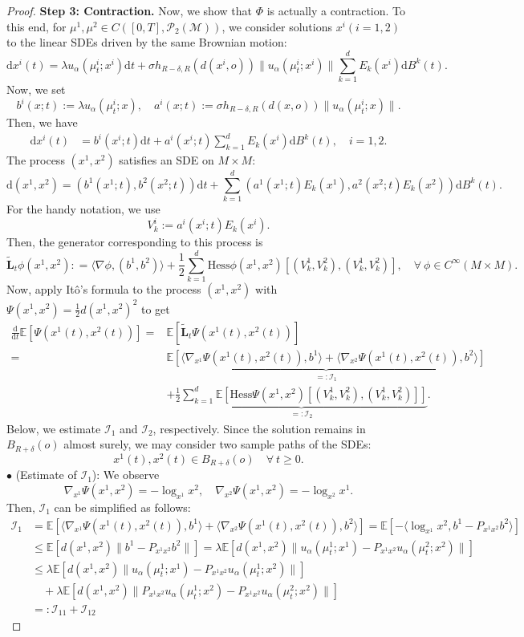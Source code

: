 \documentclass[11pt]{amsart}
\newcommand{\calM}{\mathcal{M}}
\newcommand{\calP}{\mathcal{P}}
\newcommand{\bE}{\mathbb{E}}
\def\d{\mathrm{d}}
\newcommand{\dm}{d} %
\newcommand{\p}{o}%
\newcommand{\dist}{d}%
\begin{document}
\begin{proof}
\noindent\textbf{Step 3: Contraction. }Now, we show that $\Phi$ is actually a contraction. To this end, for $\mu^1,\mu^2\in C([0,T],\calP_2(\calM))$, we consider solutions $x^i (i=1,2)$  to the linear SDEs driven by the same Brownian motion:
\begin{equation*}
    \d x^i(t)=\lambda u_\alpha(\mu_t^i;x^i)\d t+\sigma h_{R-\delta, R}(\dist(x^i,\p))\|u_\alpha(\mu_t^i;x^i)\|\sum_{k=1}^dE_k(x^i)\d B^{k}(t).
\end{equation*}
Now, we set
\[
b^i(x;t):=\lambda u_\alpha(\mu_t^i;x),\quad a^i(x;t):=\sigma h_{R-\delta, R}(\dist(x,\p))\|u_\alpha(\mu_t^i;x)\|.
\]
Then, we have
\begin{align*}
\d x^i(t)&=b^i(x^i;t)\d t+a^i(x^i;t)\sum_{k=1}^d E_k(x^i)\d B^k(t),\quad i=1, 2.
\end{align*}
The process $(x^1,x^2)$ satisfies an SDE on $M\times M$:
\[
\d(x^1,x^2)=(b^1(x^1;t),b^2(x^2;t))\d t+\sum_{k=1}^\dm(a^1(x^1;t) E_k(x^1),a^2(x^2;t) E_k(x^2))\d B^k(t).
\]
For the handy notation, we use
\[
V^i_k :=a^i(x^i;t) E_k(x^i).
\]
Then, the generator corresponding to this process is
\[
\tilde{\mathbf{L}}_t\phi(x^1, x^2) : =\langle\nabla\phi, (b^1, b^2)\rangle+\frac12\sum_{k=1}^\dm \mathrm{Hess}\phi(x^1, x^2)[(V_k^1, V_k^2), (V_k^1,V_k^2)],\quad\forall~\phi\in C^\infty(M\times M).
\]
Now, apply Itô's formula to the process $(x^1,x^2)$ with $\Psi(x^1, x^2)=\frac{1}{2}\dist(x^1, x^2)^2$ to get 
\begin{align*}
\frac{\d}{\d t}\bE[\Psi(x^1(t), x^2(t))]
=&\bE[\tilde{\mathbf{L}}_t\Psi(x^1(t),x^2(t))]\\
=&\underbrace{\bE[\langle\nabla_{x^1}\Psi(x^1(t), x^2(t)), b^1\rangle+\langle\nabla_{x^2}\Psi(x^1(t), x^2(t)), b^2\rangle]}_{=:\mathcal I_1}\\
&+\underbrace{\frac{1}{2}\sum_{k=1}^\dm\bE\left[\mathrm{Hess}\Psi(x^1, x^2)[(V_k^1, V_k^2), (V_k^1, V_k^2)]\right]}_{=:\mathcal I_2}. 
\end{align*}
Below, we estimate $\mathcal I_1$ and $\mathcal I_2$, respectively. Since the solution remains in $B_{R+\delta}(\p)$ almost surely, we may consider two sample paths of the SDEs:
\[
x^1(t), x^2(t)\in B_{R+\delta}(\p)\quad\forall~ t\ge 0.
\]
$\bullet$ (Estimate of $\mathcal I_1$): We observe 
\[
\nabla_{x^1}\Psi(x^1, x^2)=-\log_{x^1}x^2,\quad \nabla_{x^2}\Psi(x^1, x^2)=-\log_{x^2}x^1.
\]
Then, $\mathcal I_1$  can be simplified as follows:
\begin{align*}
\mathcal I_1&=\bE[\langle\nabla_{x^1}\Psi(x^1(t), x^2(t)), b^1\rangle+\langle\nabla_{x^2}\Psi(x^1(t), x^2(t)), b^2\rangle] = \bE[-\langle\log_{x^1}x^2, b^1-P_{x^1x^2}b^2\rangle]\\
&\leq\bE[\dist(x^1, x^2)\|b^1-P_{x^1x^2}b^2\|] = \lambda\bE[\dist(x^1, x^2)\|u_\alpha(\mu_t^1;x^1)-P_{x^1x^2}u_\alpha(\mu_t^2;x^2)\|]\\
&\leq\lambda\bE[\dist(x^1, x^2)\|u_\alpha(\mu_t^1;x^1)-P_{x^1x^2}u_\alpha(\mu_t^1;x^2)\|] \\
&\quad +\lambda\bE[\dist(x^1, x^2) \|P_{x^1x^2}u_\alpha(\mu_t^1;x^2)-P_{x^1x^2}u_\alpha(\mu_t^2;x^2)\|]\\
&=: \mathcal I_{11} + \mathcal I_{12}
\end{align*}


\end{proof}
\end{document}
